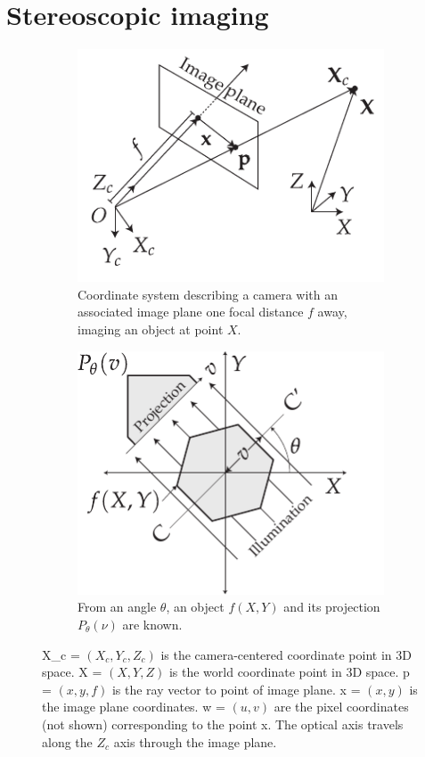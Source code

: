\documentclass{osa-article}
\begin{document}
\section*{Stereoscopic imaging}

\begin{figure}
    \centering
    \begin{subfigure}[t]{0.48\linewidth}
        \centering
        \includegraphics{./figures/coordinate_system}
        \caption[Coordinate system]{Coordinate system describing a camera with an associated image plane one focal distance \(f\) away, imaging an object at point \(X\).
        }\label{fig:coordinate_system_flopt}
    \end{subfigure}\hfill
    \begin{subfigure}[t]{0.48\linewidth}
      \centering
      \includegraphics{./figures/OPT_digram}
      \caption[Principle of OPT]{From an angle \(\theta \), an object \(f(X,Y)\) and its projection \(P_\theta(\nu)\) are known.}\label{fig:OPT_digram}
    \end{subfigure}
    \caption[Coordinates and OPT]{\gls*{X_c} = \((X_c,Y_c,Z_c)\) is the camera-centered coordinate point in 3D space.
            \gls*{X} = \((X,Y,Z)\) is the world coordinate point in 3D space.
            \gls*{p} = \((x,y,f)\) is the ray vector to point of image plane.
            \gls*{x} = \((x,y)\) is the image plane coordinates.
            \gls*{w} = \((u,v)\) are the pixel coordinates (not shown) corresponding to the point \gls*{x}.
            The optical axis travels along the \(Z_c\) axis through the image plane.}
\end{figure}
\end{document}
